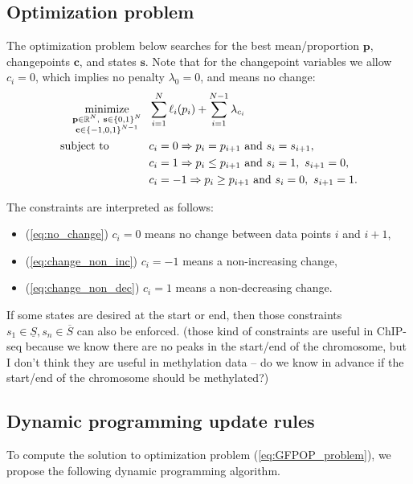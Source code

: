 \documentclass[12pt]{article}
\DeclareMathOperator*{\minimize}{minimize}
\newcommand{\RR}{\mathbb R}
\begin{document}
\subsection{Optimization problem}

The optimization problem below searches for the best mean/proportion
$\mathbf p$, changepoints $\mathbf c$, and states $\mathbf s$. Note
that for the changepoint variables we allow $c_i=0$, which implies no
penalty $\lambda_0=0$, and means no change:
\begin{align}
  \label{eq:GFPOP_problem}
  \minimize_{
    \substack{
    \mathbf p\in\RR^N,\ \mathbf s\in \{0,1\}^N\\
\mathbf c\in \{-1,0,1\}^{N-1}
}
    } &\ \ 
  \sum_{i=1}^N \ell_i(p_i) + \sum_{i=1}^{N-1} \lambda_{c_i} \\
  \text{subject to \hskip 0.9cm} &\ \ c_i = 0 \Rightarrow p_i = p_{i+1}
\text{ and } s_i = s_{i+1},
\label{eq:no_change}\\
\label{eq:change_non_dec}&\ \ c_i =1 \Rightarrow p_i \leq p_{i+1} \text{ and } s_i=1,\ s_{i+1}=0,
\\
\label{eq:change_non_inc}&\ \ c_i =-1 \Rightarrow p_i \geq p_{i+1} \text{ and } s_i=0,\ s_{i+1}=1.
\end{align}

The constraints are interpreted as follows:
\begin{itemize}
\item (\ref{eq:no_change}) $c_i=0$ means no change between data points $i$ and $i+1$, 
\item (\ref{eq:change_non_inc}) $c_i=-1$ means a non-increasing change,
\item (\ref{eq:change_non_dec}) $c_i=1$ means a non-decreasing change.
\end{itemize}

If some states are desired at the start or end, then those constraints
$s_1\in \underline S, s_n\in\overline S$ can also be enforced. (those
kind of constraints are useful in ChIP-seq because we know there are
no peaks in the start/end of the chromosome, but I don't think they
are useful in methylation data -- do we know in advance if the
start/end of the chromosome should be methylated?)

\subsection{Dynamic programming update rules}  To compute the
solution to optimization problem (\ref{eq:GFPOP_problem}), we propose the following
dynamic programming algorithm.
\end{document}
